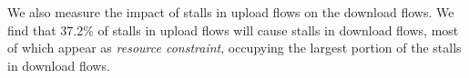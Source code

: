 We also measure the impact of stalls in upload flows on the download flows. We find that 37.2\% of stalls in upload flows will cause stalls in download flows, most of which appear as \emph{resource constraint}, occupying the largest portion of the stalls in download flows. 

